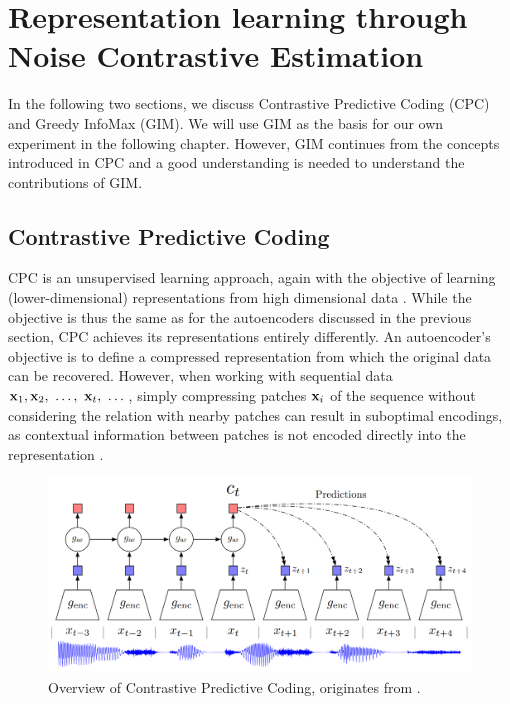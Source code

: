 	
	
	
	
	
	
	
	
	
	



\section{Representation learning through Noise Contrastive Estimation} \label{cha:bg_nce}
In the following two sections, we discuss Contrastive Predictive Coding (CPC) and Greedy InfoMax (GIM). We will use GIM as the basis for our own experiment in the following chapter. However, GIM continues from the concepts introduced in CPC and a good understanding is needed to understand the contributions of GIM.


\subsection{Contrastive Predictive Coding}
	CPC is an unsupervised learning approach, again with the objective of learning (lower-dimensional) representations from high dimensional data \citep{oordRepresentationLearningContrastive2019}. While the objective is thus the same as for the autoencoders discussed in the previous section, CPC achieves its representations entirely differently. An autoencoder's objective is to define a compressed representation from which the original data can be recovered. However, when working with sequential data $\mathbf{x}_1,\mathbf{x}_2,~\dots, ~\mathbf{x}_t,~\dots$, simply compressing patches $\mathbf{x}_i$ of the sequence without considering the relation with nearby patches can result in suboptimal encodings, as contextual information between patches is not encoded directly into the representation \citep{shah92LearningGood2020}.


\begin{figure}[h] %
	\centering
	\includegraphics[width=0.7\linewidth]{"cpc overview"}
	\caption{Overview of Contrastive Predictive Coding, originates from \citep{oordRepresentationLearningContrastive2019}.}
	\label{fig:cpc-overview}
\end{figure}


